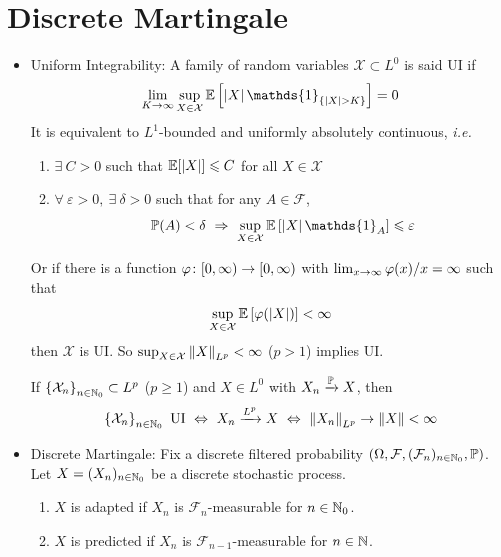 \documentclass[a4paper,12pt]{article}
\begin{document}
\section{Discrete Martingale}
\begin{itemize}
  \item Uniform Integrability: A family of random variables $\mathcal{X} \subset L^0$ is said UI if
  \begin{equation*}
    \lim_{K \sto \infty} \sup_{X \in \mathcal{X}}\E\bj{\abs{X}\mathds{1}_{\bb{\abs{X} > K}}} = 0
  \end{equation*}
  It is equivalent to $L^1$-bounded and uniformly absolutely continuous, \emph{i.e.}
  \begin{enumerate}[label=(\arabic*)]
    \item $\exists~C > 0$ such that $\mathbb{E}[\left\lvert X\right\lvert] \leqslant C$ for all $X \in \mathcal{X}$
    \item $\forall~\varepsilon > 0,~\exists~\delta > 0$ such that for any $A \in \mathcal{F}$,
    \begin{equation*}
      \Pb(A) < \delta ~\Rightarrow~ \sup_{X \in \mathcal{X}}\E\bj{\abs{X}\mathds{1}_A} \leqslant \varepsilon
    \end{equation*}
  \end{enumerate}
  Or if there is a function $\varphi \colon [0,\infty) \rightarrow [0,\infty)$ with $\lim_{x\rightarrow \infty} \varphi(x) / x = \infty$ such that
  \begin{equation*}
    \sup_{X \in \mathcal{X}}\mathbb{E}\left[\varphi(\left\lvert X\right\lvert)\right] < \infty
  \end{equation*}
  then $\mathcal{X}$ is UI. So $\sup_{X \in \mathcal{X}}\left\lVert X\right\lVert_{L^p} < \infty$ ($p>1$) implies UI.

  \noindent If $\left\{\mathcal{X}_n\right\}_{n\in \mathbb{N}_0} \subset L^p$ ($p\geqslant 1$) and $X \in L^0$ with $X_n \xrightarrow{\mathbb{P}} X$, then 
  \begin{equation*}
    \left\{\mathcal{X}_n\right\}_{n\in \mathbb{N}_0}~\text{UI}~\Leftrightarrow~X_n \xrightarrow{L^p} X ~\Leftrightarrow~\left\lVert X_n\right\lVert_{L^p} \rightarrow \left\lVert X\right\lVert < \infty
  \end{equation*}

  \item Discrete Martingale: Fix a discrete filtered probability $(\Omega, \mathcal{F}, (\mathcal{F}_n)_{n\in \mathbb{N}_0}, \mathbb{P})$. Let $X=(X_n)_{n\in \mathbb{N}_0}$ be a discrete stochastic process.
  \begin{enumerate}[label=(\arabic*)]
    \item $X$ is adapted if $X_n$ is $\mathcal{F}_n$-measurable for $n\in \mathbb{N}_0$.
    \item $X$ is predicted if $X_n$ is $\mathcal{F}_{n-1}$-measurable for $n\in \mathbb{N}$.
  \end{enumerate}


\end{itemize}
\end{document}
